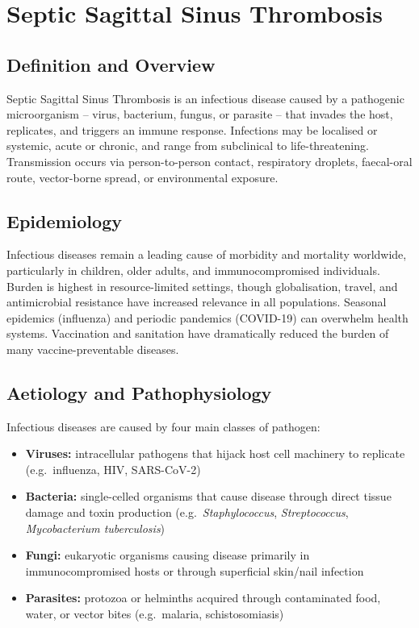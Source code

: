 \chapter{Septic Sagittal Sinus Thrombosis}

\section*{Definition and Overview}
Septic Sagittal Sinus Thrombosis is an infectious disease caused by a pathogenic microorganism -- virus, bacterium, fungus, or parasite -- that invades the host, replicates, and triggers an immune response. Infections may be localised or systemic, acute or chronic, and range from subclinical to life-threatening. Transmission occurs via person-to-person contact, respiratory droplets, faecal-oral route, vector-borne spread, or environmental exposure.

\section*{Epidemiology}
Infectious diseases remain a leading cause of morbidity and mortality worldwide, particularly in children, older adults, and immunocompromised individuals. Burden is highest in resource-limited settings, though globalisation, travel, and antimicrobial resistance have increased relevance in all populations. Seasonal epidemics (influenza) and periodic pandemics (COVID-19) can overwhelm health systems. Vaccination and sanitation have dramatically reduced the burden of many vaccine-preventable diseases.

\section*{Aetiology and Pathophysiology}
Infectious diseases are caused by four main classes of pathogen:

\begin{itemize}
    \item \textbf{Viruses:} intracellular pathogens that hijack host cell machinery to replicate (e.g.\ influenza, HIV, SARS-CoV-2)
    \item \textbf{Bacteria:} single-celled organisms that cause disease through direct tissue damage and toxin production (e.g.\ \textit{Staphylococcus}, \textit{Streptococcus}, \textit{Mycobacterium tuberculosis})
    \item \textbf{Fungi:} eukaryotic organisms causing disease primarily in immunocompromised hosts or through superficial skin/nail infection
    \item \textbf{Parasites:} protozoa or helminths acquired through contaminated food, water, or vector bites (e.g.\ malaria, schistosomiasis)
\end{itemize}


